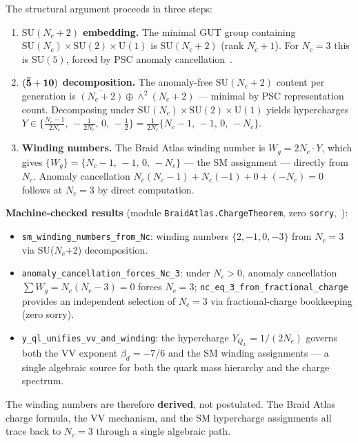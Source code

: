 \documentclass[11pt]{article}
\theoremstyle{remark}
\newcommand{\Nc}{N_c}
\begin{document}
The structural argument proceeds in three steps:
\begin{enumerate}[leftmargin=2em,itemsep=2pt]
  \item \textbf{$\mathrm{SU}(\Nc+2)$ embedding.}
    The minimal GUT group containing $\mathrm{SU}(\Nc) \times \mathrm{SU}(2) \times \mathrm{U}(1)$
    is $\mathrm{SU}(\Nc+2)$ (rank $\Nc+1$).
    For $\Nc = 3$ this is $\mathrm{SU}(5)$, forced by PSC anomaly cancellation~\cite{SpivackNEMS05}.

  \item \textbf{$({\bf\bar 5} + {\bf 10})$ decomposition.}
    The anomaly-free $\mathrm{SU}(\Nc+2)$ content per generation is
    $\overline{(\Nc+2)} \oplus \wedge^2(\Nc+2)$ --- minimal by PSC representation count.
    Decomposing under $\mathrm{SU}(\Nc) \times \mathrm{SU}(2) \times \mathrm{U}(1)$
    yields hypercharges $Y \in \{\frac{\Nc-1}{2\Nc},\,-\frac{1}{2\Nc},\,0,\,-\frac{1}{2}\}
    = \frac{1}{2\Nc}\{{\Nc-1},\,-1,\,0,\,-\Nc\}$.

  \item \textbf{Winding numbers.}
    The Braid Atlas winding number is $W_g = 2\Nc \cdot Y$, which gives
    $\{W_g\} = \{\Nc-1,\,-1,\,0,\,-\Nc\}$ --- the SM assignment --- directly from $\Nc$.
    Anomaly cancellation $\Nc(\Nc-1) + \Nc(-1) + 0 + (-\Nc) = 0$ follows at $\Nc = 3$
    by direct computation.
\end{enumerate}

\noindent\textbf{Machine-checked results} (module
\texttt{BraidAtlas.ChargeTheorem}, zero \texttt{sorry},~\cite{ugp-lean}):
\begin{itemize}[leftmargin=2em,itemsep=2pt]
  \item \texttt{sm\_winding\_numbers\_from\_Nc}:
    winding numbers $\{2,-1,0,-3\}$ from $N_c=3$ via SU($N_c$+2) decomposition.
  \item \texttt{anomaly\_cancellation\_forces\_Nc\_3}:
    under $N_c>0$, anomaly cancellation $\sum W_g = N_c(N_c-3)=0$ forces $N_c=3$;
    \texttt{nc\_eq\_3\_from\_\allowbreak fractional\_charge} provides an independent
    selection of $N_c=3$ via fractional-charge bookkeeping (zero sorry).
  \item \texttt{y\_ql\_unifies\_vv\_and\_winding}: the hypercharge $Y_{Q_L} = 1/(2\Nc)$
    governs both the VV exponent $\beta_d = -7/6$ and the SM winding assignments ---
    a single algebraic source for both the quark mass hierarchy and the charge spectrum.
\end{itemize}

The winding numbers are therefore \textbf{derived}, not postulated.
The Braid Atlas charge formula, the VV mechanism, and the SM hypercharge assignments
all trace back to $\Nc = 3$ through a single algebraic path.
\end{document}
